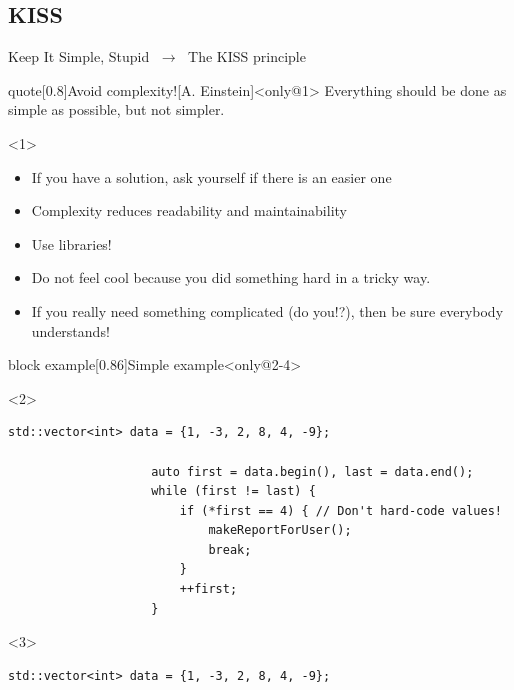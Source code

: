 \subsection{KISS}
\begin{frame}[fragile]{Keep It Simple, Stupid $\;\to\;$ The KISS principle}
    \begin{overlayarea}{\textwidth}{\textheight}
        \begin{varblock}{quote}[0.8\textwidth]{Avoid complexity!}[A. Einstein]<only@1>
            Everything should be done as simple as possible, but not simpler.
        \end{varblock}
        \begin{onlyenv}<1>
            \begin{itemize}
                \item If you have a solution, ask yourself if there is an easier one
                \item Complexity reduces readability and maintainability
                \item \alert{Use libraries!}
                \item Do not feel cool because you did something hard in a tricky way.\\
                \item If you really need something complicated (do you!?), then be sure everybody understands!
            \end{itemize}
        \end{onlyenv}
        \begin{varblock}{block example}[0.86\textwidth]{Simple example}<only@2-4>
            \begin{onlyenv}<2>
                \begin{lstlisting}[style=MyCpp]
                    std::vector<int> data = {1, -3, 2, 8, 4, -9};

                    auto first = data.begin(), last = data.end();
                    while (first != last) {
                        if (*first == 4) { // Don't hard-code values!
                            makeReportForUser();
                            break;
                        }
                        ++first;
                    }
                \end{lstlisting}
            \end{onlyenv}
            \begin{onlyenv}<3>
                \begin{lstlisting}[style=MyCpp]
                    std::vector<int> data = {1, -3, 2, 8, 4, -9};


\end{lstlisting}
\end{onlyenv}
\end{varblock}
\end{overlayarea}
\end{frame}
